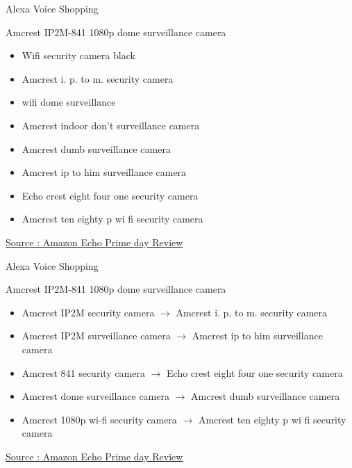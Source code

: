 \documentclass{beamer}
\begin{document}
\begin{frame}{Alexa Voice Shopping}
	\begin{block}{Amcrest IP2M-841 1080p dome surveillance camera}
		\begin{itemize}
			\item Wifi security camera black
			\item Amcrest i. p. to m. security camera
			\item wifi dome surveillance
			\item Amcrest indoor don't surveillance camera
			\item Amcrest dumb surveillance camera
			\item Amcrest ip to him surveillance camera
			\item Echo crest eight four one security camera
			\item Amcrest ten eighty p wi fi security camera
		\end{itemize}
	\end{block}

	\href{https://www.cnet.com/news/why-i-wanted-to-strangle-my-amazon-echo-on-prime-day/}{Source : Amazon Echo Prime day Review}
\end{frame}


\begin{frame}{Alexa Voice Shopping}
	\begin{block}{Amcrest IP2M-841 1080p dome surveillance camera}
		\begin{itemize}
			\item Amcrest IP2M security camera $\to$ Amcrest i. p. to m. security camera
			\item Amcrest IP2M surveillance camera $\to$ Amcrest ip to him surveillance camera
			\item Amcrest 841 security camera $\to$ Echo crest eight four one security camera
			\item Amcrest dome surveillance camera $\to$ Amcrest dumb surveillance camera
			\item Amcrest 1080p wi-fi security camera $\to$ Amcrest ten eighty p wi fi security camera
		\end{itemize}
	\end{block}

	\href{https://www.cnet.com/news/why-i-wanted-to-strangle-my-amazon-echo-on-prime-day/}{Source : Amazon Echo Prime day Review}
\end{frame}
\end{document}
